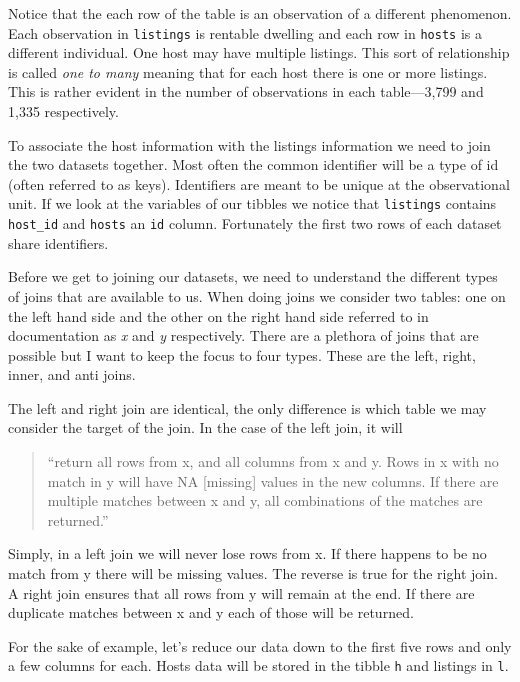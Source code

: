 \documentclass[
]{book}
\begin{document}
Notice that the each row of the table is an observation of a different phenomenon. Each observation in \texttt{listings} is rentable dwelling and each row in \texttt{hosts} is a different individual. One host may have multiple listings. This sort of relationship is called \emph{one to many} meaning that for each host there is one or more listings. This is rather evident in the number of observations in each table---3,799 and 1,335 respectively.

To associate the host information with the listings information we need to join the two datasets together. Most often the common identifier will be a type of id (often referred to as keys). Identifiers are meant to be unique at the observational unit. If we look at the variables of our tibbles we notice that \texttt{listings} contains \texttt{host\_id} and \texttt{hosts} an \texttt{id} column. Fortunately the first two rows of each dataset share identifiers.

Before we get to joining our datasets, we need to understand the different types of joins that are available to us. When doing joins we consider two tables: one on the left hand side and the other on the right hand side referred to in documentation as \emph{x} and \emph{y} respectively. There are a plethora of joins that are possible but I want to keep the focus to four types. These are the left, right, inner, and anti joins.

The left and right join are identical, the only difference is which table we may consider the target of the join. In the case of the left join, it will

\begin{quote}
``return all rows from x, and all columns from x and y. Rows in x with no match in y will have NA {[}missing{]} values in the new columns. If there are multiple matches between x and y, all combinations of the matches are returned.''
\end{quote}

Simply, in a left join we will never lose rows from x. If there happens to be no match from y there will be missing values. The reverse is true for the right join. A right join ensures that all rows from y will remain at the end. If there are duplicate matches between x and y each of those will be returned.

For the sake of example, let's reduce our data down to the first five rows and only a few columns for each. Hosts data will be stored in the tibble \texttt{h} and listings in \texttt{l}.
\end{document}

